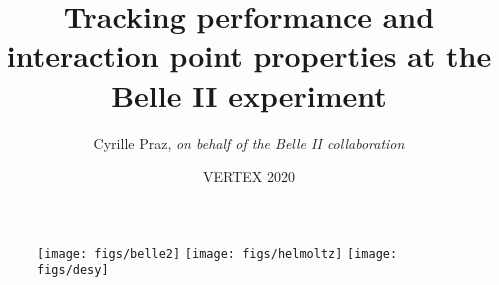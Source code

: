 \title[Tracking at Belle II]{Tracking performance and interaction point properties at the Belle II experiment}
\author[Cyrille Praz]{Cyrille Praz, \emph{on behalf of the Belle II collaboration}}
\date[2020.10.06]{VERTEX 2020}
\begin{frame}
\begin{figure}
\begin{center}
\texttt{[image: figs/belle2]}
\hspace{0.5cm}
\texttt{[image: figs/helmoltz]}
\hspace{0.5cm}
\texttt{[image: figs/desy]}
\end{center}
\end{figure}
\vspace{-0.5cm}
\titlepage
\end{frame}

